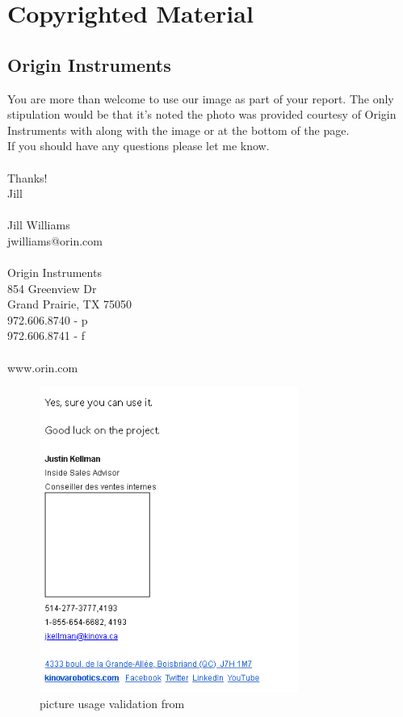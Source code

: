 
\chapter{Copyrighted Material}\label{AppendixA}

\section{Origin Instruments}\label{st:Origin}
You are more than welcome to use our image as part of your report.  The only stipulation would be that it's noted the photo was provided courtesy of Origin Instruments with along with the image or at the bottom of the page.\\
If you should have any questions please let me know.\\
\\
Thanks!\\
Jill\\
\\
Jill Williams\\
jwilliams@orin.com\\
\\
Origin Instruments\\
854 Greenview Dr\\
Grand Prairie, TX   75050\\
972.606.8740 - p\\
972.606.8741 - f\\
\\ 
www.orin.com\\

\begin{figure}[H]
    \centering
    \includegraphics[width=\textwidth,height=10cm]{Figures/AAU/sebastien.PNG}
    \caption{picture usage validation from \cite{Kinova}}
    \label{fig:KinovaPicture}
\end{figure}

